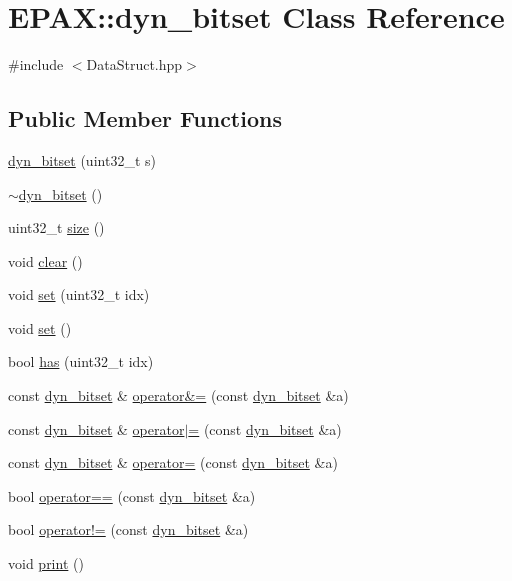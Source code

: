 \hypertarget{class_e_p_a_x_1_1dyn__bitset}{\section{\-E\-P\-A\-X\-:\-:dyn\-\_\-bitset \-Class \-Reference}
\label{class_e_p_a_x_1_1dyn__bitset}
}


{\ttfamily \#include $<$\-Data\-Struct.\-hpp$>$}

\subsection*{\-Public \-Member \-Functions}
\begin{DoxyCompactItemize}
\item 
\hyperlink{class_e_p_a_x_1_1dyn__bitset_a482f0733c5e7b388a68d480ab581c15d}{dyn\-\_\-bitset} (uint32\-\_\-t s)
\item 
\hyperlink{class_e_p_a_x_1_1dyn__bitset_ab6c3c124802be52c47e77217633a8c19}{$\sim$dyn\-\_\-bitset} ()
\item 
uint32\-\_\-t \hyperlink{class_e_p_a_x_1_1dyn__bitset_a95c5e511a3a35c3534693f2f3577ce9e}{size} ()
\item 
void \hyperlink{class_e_p_a_x_1_1dyn__bitset_a5dd33f74e4d5f0314412ec8bbd2eb4c4}{clear} ()
\item 
void \hyperlink{class_e_p_a_x_1_1dyn__bitset_a8da97b017dea3fde6c37080a3cef8b34}{set} (uint32\-\_\-t idx)
\item 
void \hyperlink{class_e_p_a_x_1_1dyn__bitset_a58d45e3ac927a7a6f3b3c90167ce3b63}{set} ()
\item 
bool \hyperlink{class_e_p_a_x_1_1dyn__bitset_aa1ecee19c2e95ec42bc9fbcdb18e9717}{has} (uint32\-\_\-t idx)
\item 
const \hyperlink{class_e_p_a_x_1_1dyn__bitset}{dyn\-\_\-bitset} \& \hyperlink{class_e_p_a_x_1_1dyn__bitset_a8c06eb9f7b0bf7a307a618b6627d157c}{operator\&=} (const \hyperlink{class_e_p_a_x_1_1dyn__bitset}{dyn\-\_\-bitset} \&a)
\item 
const \hyperlink{class_e_p_a_x_1_1dyn__bitset}{dyn\-\_\-bitset} \& \hyperlink{class_e_p_a_x_1_1dyn__bitset_a1601d2a9ac9ac5a13d29ef158fc8f6fd}{operator$|$=} (const \hyperlink{class_e_p_a_x_1_1dyn__bitset}{dyn\-\_\-bitset} \&a)
\item 
const \hyperlink{class_e_p_a_x_1_1dyn__bitset}{dyn\-\_\-bitset} \& \hyperlink{class_e_p_a_x_1_1dyn__bitset_a74cee72a00dbc067c1496f2f1f5cdbd4}{operator=} (const \hyperlink{class_e_p_a_x_1_1dyn__bitset}{dyn\-\_\-bitset} \&a)
\item 
bool \hyperlink{class_e_p_a_x_1_1dyn__bitset_a27405cf690eca04e413f38b7fd2fe2f9}{operator==} (const \hyperlink{class_e_p_a_x_1_1dyn__bitset}{dyn\-\_\-bitset} \&a)
\item 
bool \hyperlink{class_e_p_a_x_1_1dyn__bitset_a620d1d5222f87563b153c26086b858ea}{operator!=} (const \hyperlink{class_e_p_a_x_1_1dyn__bitset}{dyn\-\_\-bitset} \&a)
\item 
void \hyperlink{class_e_p_a_x_1_1dyn__bitset_a42ae36208d99f40148f41aed21538ea2}{print} ()
\end{DoxyCompactItemize}

